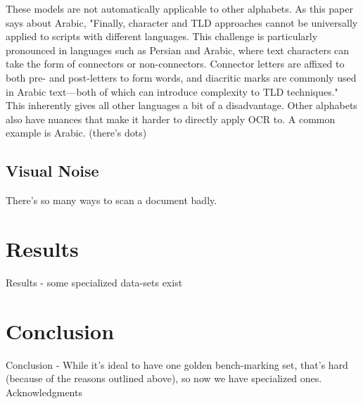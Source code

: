 \documentclass[sigplan,screen,nonacm]{acmart-tagged}
\begin{document}
These models are not automatically applicable to other alphabets. As this paper\cite{Fateh:2024} says about Arabic, "Finally, character and TLD approaches cannot be universally applied to scripts with different languages. This challenge is particularly pronounced in languages such as Persian and Arabic, where text characters can take the form of connectors or non-connectors. Connector letters are affixed to both pre- and post-letters to form words, and diacritic marks are commonly used in Arabic text—both of which can introduce complexity to TLD techniques." This inherently gives all other languages a bit of a disadvantage. Other alphabets also have nuances that make it harder to directly apply OCR to. A common example is Arabic. (there's dots) \cite{Fateh:2024, Hegghamer:2022}

\subsection{Visual Noise}
\label{sec:Noise}

There’s so many ways to scan a document badly. \cite{Hegghamer:2022}

\section{Results}
\label{sec:Results}

Results - some specialized data-sets exist \cite{Fateh:2024,Hegghamer:2022}

\section{Conclusion}
\label{sec:Conclusion}

Conclusion - While it's ideal to have one golden bench-marking set, that's hard (because of the reasons outlined above), so now we have specialized ones.
Acknowledgments

\end{document}
